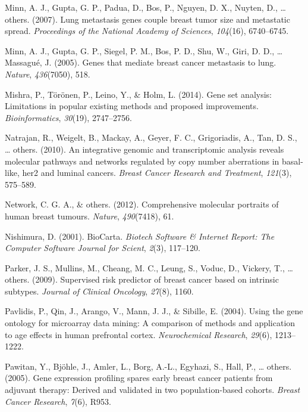 \documentclass[12pt,twoside]{reedthesis}
\begin{document}
\leavevmode\hypertarget{ref-minn2007lung}{}%
Minn, A. J., Gupta, G. P., Padua, D., Bos, P., Nguyen, D. X., Nuyten, D., \ldots{} others. (2007). Lung metastasis genes couple breast tumor size and metastatic spread. \emph{Proceedings of the National Academy of Sciences}, \emph{104}(16), 6740--6745.

\leavevmode\hypertarget{ref-minn2005genes}{}%
Minn, A. J., Gupta, G. P., Siegel, P. M., Bos, P. D., Shu, W., Giri, D. D., \ldots{} Massagué, J. (2005). Genes that mediate breast cancer metastasis to lung. \emph{Nature}, \emph{436}(7050), 518.

\leavevmode\hypertarget{ref-mishra2014gene}{}%
Mishra, P., Törönen, P., Leino, Y., \& Holm, L. (2014). Gene set analysis: Limitations in popular existing methods and proposed improvements. \emph{Bioinformatics}, \emph{30}(19), 2747--2756.

\leavevmode\hypertarget{ref-natrajan2010integrative}{}%
Natrajan, R., Weigelt, B., Mackay, A., Geyer, F. C., Grigoriadis, A., Tan, D. S., \ldots{} others. (2010). An integrative genomic and transcriptomic analysis reveals molecular pathways and networks regulated by copy number aberrations in basal-like, her2 and luminal cancers. \emph{Breast Cancer Research and Treatment}, \emph{121}(3), 575--589.

\leavevmode\hypertarget{ref-cancer2012comprehensive}{}%
Network, C. G. A., \& others. (2012). Comprehensive molecular portraits of human breast tumours. \emph{Nature}, \emph{490}(7418), 61.

\leavevmode\hypertarget{ref-nishimura2001biocarta}{}%
Nishimura, D. (2001). BioCarta. \emph{Biotech Software \& Internet Report: The Computer Software Journal for Scient}, \emph{2}(3), 117--120.

\leavevmode\hypertarget{ref-parker2009supervised}{}%
Parker, J. S., Mullins, M., Cheang, M. C., Leung, S., Voduc, D., Vickery, T., \ldots{} others. (2009). Supervised risk predictor of breast cancer based on intrinsic subtypes. \emph{Journal of Clinical Oncology}, \emph{27}(8), 1160.

\leavevmode\hypertarget{ref-pavlidis2004using}{}%
Pavlidis, P., Qin, J., Arango, V., Mann, J. J., \& Sibille, E. (2004). Using the gene ontology for microarray data mining: A comparison of methods and application to age effects in human prefrontal cortex. \emph{Neurochemical Research}, \emph{29}(6), 1213--1222.

\leavevmode\hypertarget{ref-pawitan2005gene}{}%
Pawitan, Y., Bjöhle, J., Amler, L., Borg, A.-L., Egyhazi, S., Hall, P., \ldots{} others. (2005). Gene expression profiling spares early breast cancer patients from adjuvant therapy: Derived and validated in two population-based cohorts. \emph{Breast Cancer Research}, \emph{7}(6), R953.
\end{document}

